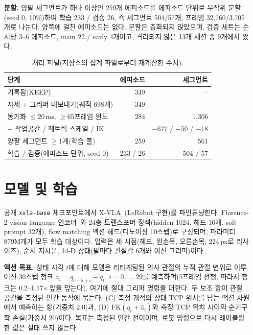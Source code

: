 \documentclass[conference,10pt]{IEEEtran}
\begin{document}
\textbf{분할.} 양팔 세그먼트가 하나 이상인 259개 에피소드를 에피소드 단위로 무작위 분할(seed 0, 10\%)하여 학습 233 / 검증 26, 즉
세그먼트 504/57개, 프레임 32{,}760/3{,}705개로 나눈다. 양쪽에 걸친 에피소드는 없다. 분할은 층화되지 않았으며, 검증 세트는 순서당 3--6
에피소드, main 22 / early 4개이고, 격리되지 않은 13개 세션 중 9개에서 왔다.

\begin{table}[t]
\centering\footnotesize
\caption{처리 퍼널(저장소의 집계 파일로부터 재계산한 수치).}
\label{tab:funnel}
\setlength{\tabcolsep}{4pt}\begin{tabular}{@{}lrr@{}}
\toprule
단계 & 에피소드 & 세그먼트 \\
\midrule
기록됨(KEEP) & 349 & -- \\
자세 + 그리퍼 내보내기(궤적 698개) & 349 & -- \\
동기화 $\le$20\,ms, $\ge$65프레임 윈도 & 284 & 1{,}306 \\
\quad $-$ 작업공간 / 메트릭 스케일 / IK & & $-$677 / $-$50 / $-$18 \\
양팔 세그먼트 $\ge$1개(학습 풀) & 259 & 561 \\
\quad 학습 / 검증(에피소드 단위, seed 0) & 233 / 26 & 504 / 57 \\
\bottomrule
\end{tabular}
\end{table}

\section{모델 및 학습}\label{sec:model}
공개 \texttt{xvla-base} 체크포인트에서 X-VLA~\cite{zheng2025xvla}(LeRobot 구현)를 파인튜닝한다. Florence-2 vision-language
인코더~\cite{xiao2024florence2}와 24층 트랜스포머 정책(hidden 1024, 헤드 16개, soft prompt 32개), flow matching 액션 헤드(디노이징
10스텝)로 구성되며, 파라미터 879M개가 모두 학습 대상이다. 입력은 세 시점(헤드, 왼손목, 오른손목; 224\,px로 리사이즈), 순서 지시문,
14-D 상태(팔마다 관절각 6개와 이진 그리퍼)이다.

\textbf{액션 목표.} 상태 시각 $t$에 대해 모델은 리타게팅된 의사 관절의 누적 관절 변위로 이루어진 30스텝 청크
$a_i = q_{t+5+i}-q_t$, $i=0,\dots,29$를 예측하며(5프레임 선행, 따라서 청크는 0.2--1.17\,s 앞을 덮는다), 여기에 절대 그리퍼 명령을
더한다. 두 보조 항이 관절 공간을 측정된 인간 동작에 묶는다. (C) 측정 궤적의 상대 TCP 위치를 남는 액션 차원에서 예측하는 항(가중치
2.0)과, (D) $\mathrm{FK}(q_t+\hat a_i)$와 측정 TCP 위치 사이의 순기구학 손실(가중치 20)이다. 목표는 측정된 인간 전이이며, 로봇
명령으로 다시 레이블링한 값은 절대 쓰지 않는다.
\end{document}
